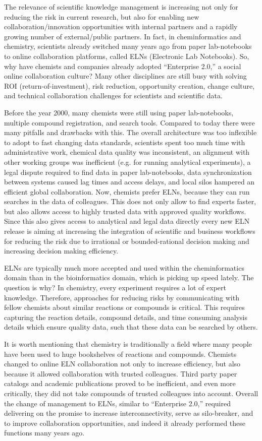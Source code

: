 \documentclass{sig-alternate}
\begin{document}
The relevance of scientific knowledge management is increasing not only for
reducing the risk in current research, but also for enabling new
collaboration/innovation opportunities with internal partners and a rapidly growing
number of external/public partners. In fact, in cheminformatics and chemistry,
scientists already switched many years ago from paper lab-notebooks to
online collaboration platforms, called ELNs (Electronic Lab Notebooks). So, why
have chemists and companies already adopted ``Enterprise 2.0,'' a social
online collaboration culture? Many other disciplines are still busy with solving
ROI (return-of-investment), risk reduction, opportunity creation, change
culture, and technical collaboration challenges for scientists and scientific
data.

Before the year 2000, many chemists were still using paper
lab-notebooks, multiple compound registration, and search tools. Compared to
today there were many pitfalls and drawbacks with this. The overall architecture
was too inflexible to adopt to fast changing data standards, scientists spent
too much time with administrative work, chemical data quality was inconsistent,
an alignment with other working groups was inefficient (e.g. for running
analytical experiments), a legal dispute required to find data in paper
lab-notebooks, data synchronization between systems caused lag times and access
delays, and local silos hampered an efficient global collaboration. Now,
chemists prefer ELNs, because they can run searches in the data of colleagues. This does
not only allow to find experts faster, but also allows access to highly trusted
data with approved quality workflows. Since this also gives access to
analytical and legal data directly every new ELN release is aiming at increasing
the integration of scientific and business workflows for reducing the risk due
to irrational or bounded-rational decision making and increasing decision making
efficiency.

ELNs are typically much more accepted and used within the cheminformatics
domain than in the bioinformatics domain, which is picking up speed lately. The
question is why? In chemistry, every experiment requires a lot of expert
knowledge. Therefore, approaches for reducing risks by communicating
with fellow chemists about similar reactions or compounds is critical. This
requires capturing the reaction details, compound details, and time consuming
analysis details which ensure quality data, such that these data can be searched by others.

It is worth mentioning that chemistry is traditionally a field where many people
have been used to huge bookshelves of reactions and compounds. Chemists changed
to online ELN collaboration not only to increase efficiency, but also
because it allowed collaboration with trusted colleagues. Third party paper
catalogs and academic publications proved to be
inefficient, and even more critically, they did not take compounds of trusted
colleagues into account. Overall the change of management to ELNs, similar to
``Enterprise 2.0,'' required delivering on the promise to increase
interconnectivity, serve as silo-breaker, and to improve collaboration
opportunities, and indeed it already performed these functions many years ago.
\end{document}
